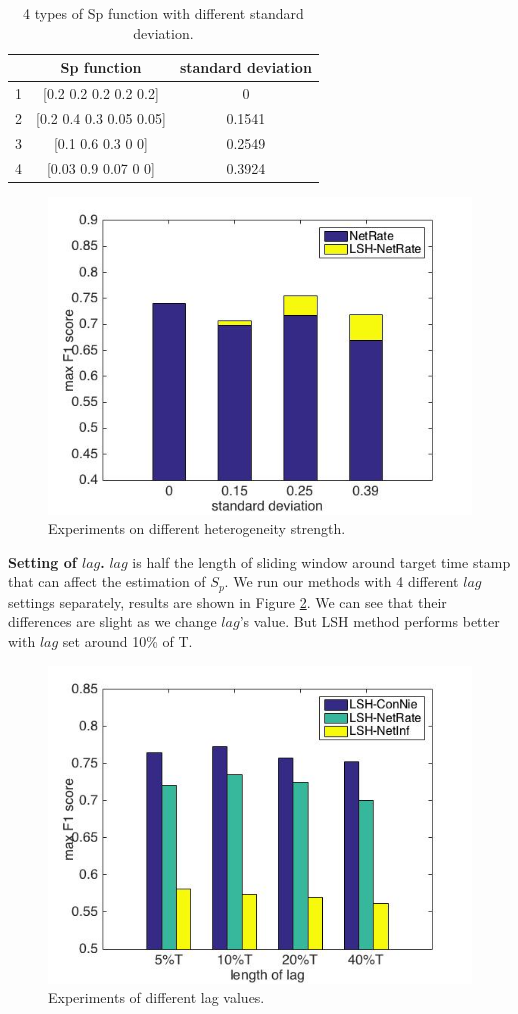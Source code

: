 \begin{table}[H]
\caption{4 types of Sp function with different standard deviation.}
\begin{tabular}{c|c|c}
 & Sp function & standard deviation \\
\hline
1 & [0.2 0.2 0.2 0.2 0.2] & 0\\
2 & [0.2 0.4 0.3 0.05 0.05] & 0.1541\\
3 & [0.1 0.6 0.3 0 0] & 0.2549\\
4 & [0.03 0.9 0.07 0 0] & 0.3924
\end{tabular}\label{tab:Spfunction}
\end{table}
\begin{figure}[H]
\centerline{
\includegraphics[width=0.75\linewidth]{figures/HeteroStrength.jpg}}
\caption{Experiments on different heterogeneity strength. }\label{fig:Hete}
\end{figure}
\textbf{Setting of $lag$.} $lag$ is half the length of sliding window around target time stamp that can affect the estimation of $S_p$. We run our methods with 4 different $lag$ settings separately, results are shown in Figure \ref{fig:SetLAG}. We can see that their differences are slight as we change $lag$'s value. But LSH method performs better with $lag$ set around 10\% of T.
\begin{figure}[H]
\centerline{
\includegraphics[width=0.75\linewidth]{figures/SettingLAG.jpg}}
\caption{Experiments of different lag values. }\label{fig:SetLAG}
\end{figure}
